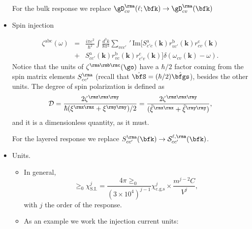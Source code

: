 \documentclass[12pt,leqno]{article}
\numberwithin{equation}{section}
\begin{document}
\begin{itemize}
For the bulk response we replace 
$\gD_{cv}^{\rma}(\ell;\bfk) \to \gD_{cv}^{\rma}(\bfk)$

\item Spin injection

\begin{eqnarray*}\label{zetaabci}
\zeta^{\mathrm{abc}}(\omega)
&=&
\frac{i\pi e^2}{\hbar^2}
\int\frac{d^3k}{8\pi^3}
\sum_{vcc'}\,'\,
\mathrm{Im}\Big[S^{\mathrm{a}}_{c'c}(\mathbf{k}) r^{\mathrm{b}}_{vc'}(\mathbf{k}) r^{\mathrm{c}}_{cv}(\mathbf{k})
\nonumber\\
&+& 
S^{\mathrm{a}}_{cc'}(\mathbf{k}) r^{\mathrm{b}}_{vc}(\mathbf{k}) r^{\mathrm{c}}_{c'v}(\mathbf{k})\Big]
\delta(\omega_{cv}(\mathbf{k})-\omega)
.
\end{eqnarray*}  
Notice that the units of $\zeta^{\rma\rmb\rmc}(\go)$ have a $\hbar/2$
factor coming from the spin matrix elements $S^{\rma}_{cc'}$ (recall
that
$\hat \bfS=(\hbar/2)\hat\bfgs$), besides the other units.
The degree of spin polarization is defined as
\begin{equation}\label{dps}
{\cal
  D}=\frac{2\zeta^{\rmz\rmx\rmy}}{\hbar(\xi^{\rmx\rmx}+\xi^{\rmy\rmy})/2}
=\frac{2\zeta^{\rmz\rmx\rmy}}{(\tilde\xi^{\rmx\rmx}+\tilde\xi^{\rmy\rmy})}
,\nonumber
\end{equation}    
and it is a dimensionless quantity, as it must. 

For the layered response we replace $S^{\rma}_{cc'}(\bfk)\to {\cal S}^{\ell,\rma}_{cc'}(\bfk)$. 

\item Units. 
\begin{itemize}

\item In general, 
\begin{equation*}\label{si}
\ge_0\chi_{\mathrm{S.I.}}^{j}=\frac{4\pi\ge_0}{(3\times
 10^4)^{j-1}}\chi^{j}_{\mathrm{c.g.s}} \times \frac{m^{j-2}C}{V^j}
,
\end{equation*} 
with $j$ the order of the response. 

\item As an example we work the injection current units:


\end{itemize}
\end{itemize}
\end{document}

